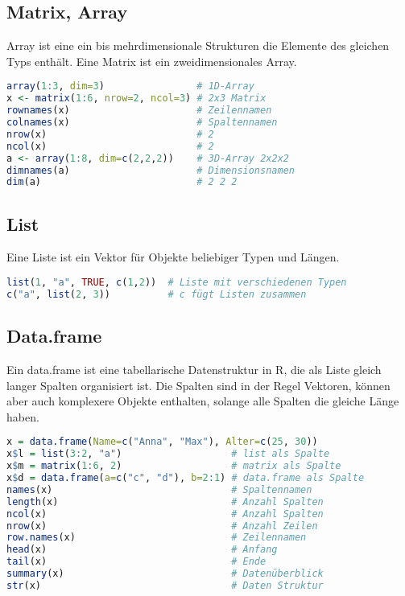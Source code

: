 \documentclass[10pt,twocolumn]{scrartcl}
\begin{document}
\subsection{Matrix, Array}

Array ist eine ein bis mehrdimensionale Strukturen die Elemente des gleichen Typs enthält. Eine Matrix ist ein zweidimensionales Array.

\begin{lstlisting}[language=R]
array(1:3, dim=3)                # 1D-Array
x <- matrix(1:6, nrow=2, ncol=3) # 2x3 Matrix
rownames(x)                      # Zeilennamen
colnames(x)                      # Spaltennamen
nrow(x)                          # 2
ncol(x)                          # 2
a <- array(1:8, dim=c(2,2,2))    # 3D-Array 2x2x2
dimnames(a)                      # Dimensionsnamen
dim(a)                           # 2 2 2
\end{lstlisting}

\subsection{List}

Eine Liste ist ein Vektor für Objekte beliebiger Typen und Längen.

\begin{lstlisting}[language=R]
list(1, "a", TRUE, c(1,2))  # Liste mit verschiedenen Typen
c("a", list(2, 3))          # c fügt Listen zusammen
\end{lstlisting}

\subsection{Data.frame}

Ein data.frame ist eine tabellarische Datenstruktur in R, die als Liste gleich langer Spalten organisiert ist. Die Spalten sind in der Regel Vektoren, können aber auch komplexere Objekte enthalten, solange alle Spalten die gleiche Länge haben.

\begin{lstlisting}[language=R]
x = data.frame(Name=c("Anna", "Max"), Alter=c(25, 30))
x$l = list(3:2, "a")                   # list als Spalte
x$m = matrix(1:6, 2)                   # matrix als Spalte
x$d = data.frame(a=c("c", "d"), b=2:1) # data.frame als Spalte
names(x)                               # Spaltennamen
length(x)                              # Anzahl Spalten
ncol(x)                                # Anzahl Spalten
nrow(x)                                # Anzahl Zeilen
row.names(x)                           # Zeilennamen
head(x)                                # Anfang
tail(x)                                # Ende
summary(x)                             # Datenüberblick
str(x)                                 # Daten Struktur
\end{lstlisting}
\end{document}
